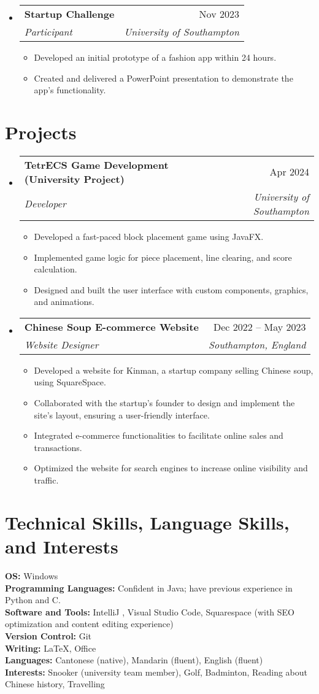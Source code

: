\documentclass[letterpaper,10pt]{article}
\makeatletter
\newcommand{\resumeItem}[1]{
  \item\small{
    {#1 \vspace{-2pt}}
  }
}
\newcommand{\resumeSubheading}[4]{
  \vspace{-2pt}\item
    \begin{tabular*}{0.97\textwidth}[t]{l@{\extracolsep{\fill}}r}
      \textbf{#1} & #2 \\
      \textit{\small#3} & \textit{\small #4} \\
    \end{tabular*}\vspace{-7pt}
}
\newcommand{\resumeSubHeadingListStart}{\begin{itemize}[leftmargin=0.15in, label={}]}
\newcommand{\resumeSubHeadingListEnd}{\end{itemize}}
\newcommand{\resumeItemListStart}{\begin{itemize}}
\newcommand{\resumeItemListEnd}{\end{itemize}\vspace{-5pt}}
\makeatother
\begin{document}
\resumeSubHeadingListStart
    \resumeSubheading
      {Startup Challenge}{Nov 2023}
      {Participant}{University of Southampton}
      \resumeItemListStart
        \resumeItem{Developed an initial prototype of a fashion app within 24 hours.}
        \resumeItem{Created and delivered a PowerPoint presentation to demonstrate the app's functionality.}
      \resumeItemListEnd
\resumeSubHeadingListEnd 

\vspace{10mm}

\section{Projects}
\resumeSubHeadingListStart
    \resumeSubheading
      {TetrECS Game Development (University Project)}{Apr 2024}
      {Developer}{University of Southampton}
      \resumeItemListStart
        \resumeItem{Developed a fast-paced block placement game using JavaFX.}
        \resumeItem{Implemented game logic for piece placement, line clearing, and score calculation.}
        \resumeItem{Designed and built the user interface with custom components, graphics, and animations.}
      \resumeItemListEnd
\resumeSubHeadingListEnd

\resumeSubHeadingListStart
    \resumeSubheading
      {Chinese Soup E-commerce Website}{Dec 2022 -- May 2023}
      {Website Designer}{Southampton, England}
      \resumeItemListStart
        \resumeItem{Developed a website for Kinman, a startup company selling Chinese soup, using SquareSpace.}
        \resumeItem{Collaborated with the startup's founder to design and implement the site's layout, ensuring a user-friendly interface.}
        \resumeItem{Integrated e-commerce functionalities to facilitate online sales and transactions.}
        \resumeItem{Optimized the website for search engines to increase online visibility and traffic.}
      \resumeItemListEnd
\resumeSubHeadingListEnd

\section{Technical Skills, Language Skills, and Interests}
 \begin{itemize}[leftmargin=0.15in, label={}]
    \small{\item{
    \textbf{OS:} Windows \\
    \textbf{Programming Languages:} Confident in Java; have previous experience in Python and C. \\
    \textbf{Software and Tools:} IntelliJ , Visual Studio Code, Squarespace (with SEO optimization and content editing experience) \\
    \textbf{Version Control:} Git \\
    \textbf{Writing:} \LaTeX, Office \\
    \textbf{Languages:} Cantonese (native), Mandarin (fluent), English (fluent) \\
    \textbf{Interests:} Snooker (university team member), Golf, Badminton, Reading about Chinese history, Travelling
    }}
 \end{itemize}
\end{document}
